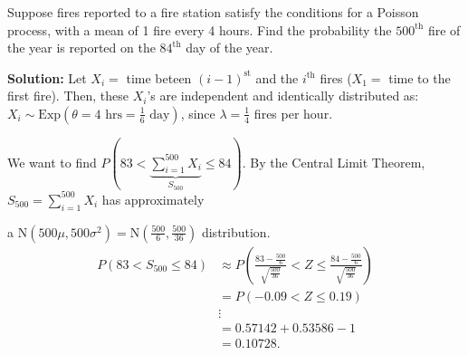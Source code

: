 \begin{example}
    Suppose fires reported to a fire station satisfy the conditions for a Poisson process, with a mean of 1 fire every 4 hours. Find the probability the $500^{\text{th}}$ fire of the year is reported on the $84^{\text{th}}$ day of the year.

    \textbf{Solution:} Let $X_i =$ time beteen $(i-1)^{\text{st}}$ and the $i^{\text{th}}$ fires ($X_1 =$ time to the first fire). Then, these $X_i$'s are independent and identically distributed as: $X_i \sim \text{Exp}(\theta = 4 \text{ hrs} = \frac{1}{6} \text{ day})$, since $\lambda = \frac{1}{4}$ fires per hour.


    We want to find $P \left( 83 < \underbrace{\displaystyle \sum_{i=1}^{500} X_i}_{S_{500}} \leq 84 \right)$. By the Central Limit Theorem, $S_{500} = \displaystyle \sum_{i=1}^{500} X_i$ has approximately \vspace{-2mm}

    a $\text{N}(500\mu , 500\sigma^2) = \text{N}(\frac{500}{6}, \frac{500}{36})$ distribution. 
    \begin{align*}
        P(83 < S_{500} \leq 84) &\approx P \left( \frac{83 - \frac{500}{6}}{\sqrt{\frac{500}{36}}} < Z \leq \frac{84 - \frac{500}{6}}{\sqrt{\frac{500}{36}}} \right) \\
        &= P(-0.09 < Z \leq 0.19) \\
        &\vdots \\
        &= 0.57142 + 0.53586 - 1 \\
        &= 0.10728.
    \end{align*}
\end{example}


